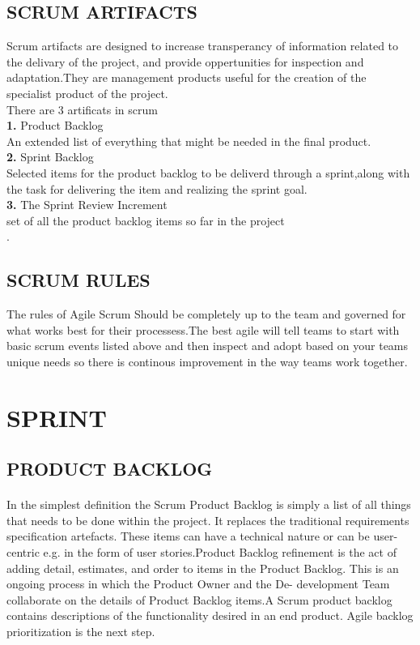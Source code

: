 \documentclass[a4paper, 12pt]{report}
\begin{document}
\subsection{ SCRUM ARTIFACTS}
Scrum artifacts are designed to increase transperancy of information related to the delivary of the project, and provide oppertunities for inspection and adaptation.They are management products useful for the creation of the specialist product of the project.\\
There are 3 artificats in scrum\\
\textbf{1.} Product Backlog\\
An extended list of everything that might be needed in the final product.\\
\textbf{2.} Sprint Backlog\\
Selected items for the product backlog to be deliverd through a sprint,along with the task for delivering the item and realizing the sprint goal.\\
\textbf{3.} The Sprint Review Increment\\
set of all the product backlog items so far in the project\\.
\subsection{SCRUM RULES}
The rules of Agile Scrum Should be completely up to the team and governed for what works best for their processess.The best agile will tell teams to start with basic scrum events listed above and then inspect and adopt based on your teams unique needs so there is continous improvement in the way teams work together.
\section{SPRINT }

\subsection{PRODUCT BACKLOG}

\paragraph{}
In the simplest deﬁnition the Scrum Product Backlog is simply a list of all things that needs to be done within the project. It replaces the traditional requirements speciﬁcation artefacts. These items can have a technical nature or can be user-centric e.g. in the form of user stories.Product Backlog reﬁnement is the act of adding detail, estimates, and order to items in the Product Backlog. This is an ongoing process in which the Product Owner and the De- development Team collaborate on the details of Product Backlog items.A Scrum product backlog contains descriptions of the functionality desired in an end product. Agile backlog prioritization is the next step.
\end{document}
